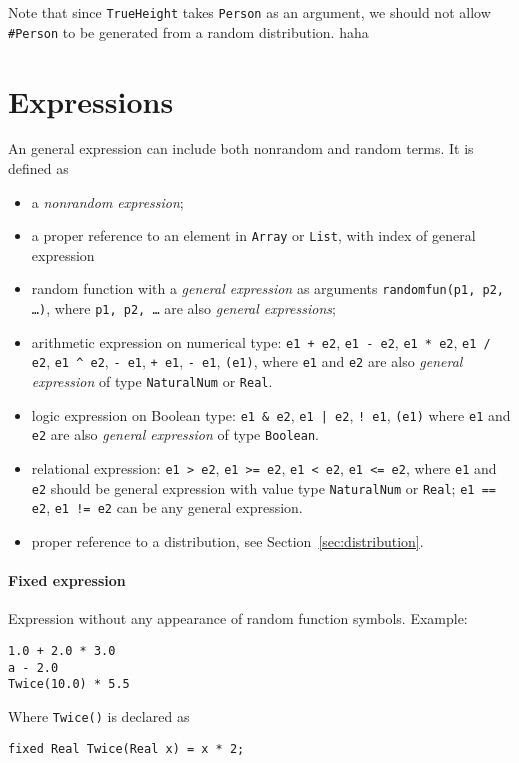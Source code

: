 \documentclass[12pt]{article}
\begin{document}
Note that since \texttt{TrueHeight} takes \texttt{Person} as an argument, we should not allow \texttt{\#Person} to be generated from a random distribution.
haha

\section{Expressions}
\label{sec:expression}
An general expression can include both nonrandom and random terms.
It is defined as
\begin{itemize}
\item a \emph{nonrandom expression};
\item a proper reference to an element in {\tt Array} or {\tt List}, with index of general expression\;
 \item random function with a \emph{general expression} as arguments {\tt randomfun(p1, p2, \dots)},
  where {\tt p1, p2, \dots} are also \emph{general expressions};
\item arithmetic expression on numerical type: \texttt{e1 + e2}, \texttt{e1 - e2}, \texttt{e1 * e2}, \texttt{e1 / e2}, \texttt{e1 \^{} e2}, \texttt{- e1}, \texttt{+ e1}, \texttt{- e1}, \texttt{(e1)}, where \texttt{e1} and \texttt{e2} are also \emph{general expression} of type \texttt{NaturalNum} or \texttt{Real}.
\item logic expression on Boolean type: \texttt{e1 \& e2}, \texttt{e1 | e2}, \texttt{! e1}, \texttt{(e1)} where 
\texttt{e1} and \texttt{e2} are also \emph{general expression} of type \texttt{Boolean}.
\item relational expression: \texttt{e1 > e2}, \texttt{e1 >= e2}, \texttt{e1 < e2}, \texttt{e1 <= e2}, where \texttt{e1} and \texttt{e2} should be general expression with value type \texttt{NaturalNum} or \texttt{Real}; \texttt{e1 == e2}, \texttt{e1 != e2} can be any general expression.
\item proper reference to a distribution, see Section~\ref{sec:distribution}.
\end{itemize}

\paragraph{Fixed expression}
Expression without any appearance of random function symbols. 
Example:
\begin{verbatim}
1.0 + 2.0 * 3.0
a - 2.0
Twice(10.0) * 5.5
\end{verbatim}
Where \texttt{Twice(\mycdot)} is declared as 
\begin{verbatim}
fixed Real Twice(Real x) = x * 2;
\end{verbatim}
\end{document}
